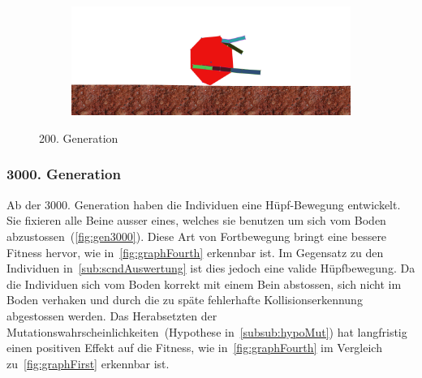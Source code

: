 \begin{figure}[H]
\begin{subfigure}[b]{0.45\textwidth}
            \includegraphics[width=\linewidth,center]{graphics/simulation-results/4_gen200_4}
            \caption{\label{fig:gen200_4}}
          \end{subfigure}
          \caption{200. Generation\label{fig:gen200}}
        \end{figure}

      \subsubsection{3000. Generation\label{subsub:3000gen}}

        Ab der 3000. Generation haben die Individuen eine Hüpf-Bewegung entwickelt.
        Sie fixieren alle Beine ausser eines, welches sie benutzen um sich vom Boden abzustossen~(\vref{fig:gen3000}).
        Diese Art von Fortbewegung bringt eine bessere Fitness hervor, wie in~\vref{fig:graphFourth} erkennbar ist.
        Im Gegensatz zu den Individuen in~\vref{sub:scndAuswertung} ist dies jedoch eine valide Hüpfbewegung.
        Da die Individuen sich vom Boden korrekt mit einem Bein abstossen,
        sich nicht im Boden verhaken und durch die zu späte fehlerhafte Kollisionserkennung abgestossen werden.
        Das Herabsetzten der Mutationswahrscheinlichkeiten~(Hypothese in~\vref{subsub:hypoMut})
        hat langfristig einen positiven Effekt auf die Fitness,
        wie in~\vref{fig:graphFourth} im Vergleich zu~\vref{fig:graphFirst} erkennbar ist.

        \vspace{0.5cm}

